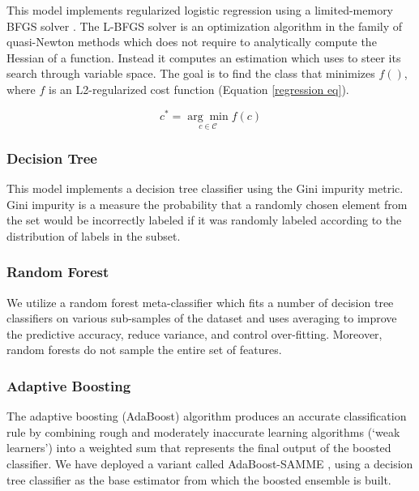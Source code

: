 \documentclass[letterpaper]{article}
\begin{document}
This model implements regularized logistic regression using a limited-memory BFGS solver \cite{liu1989limited}. The L-BFGS solver is an optimization algorithm in the family of quasi-Newton methods which does not require to analytically compute the Hessian of a function. Instead it computes an estimation which uses to steer its search through variable space. The goal is to find the class that minimizes $f()$, where $f$ is an L2-regularized cost function (Equation \ref{regression eq}).

\begin{equation} \label{regression eq}
	c^* = \underset{c \in \mathcal{C}}{\arg \min} f(c) 
\end{equation}

\subsubsection{Decision Tree} \label{Decision Tree}

This model implements a decision tree classifier using the Gini impurity metric. Gini impurity is a measure the probability that a randomly chosen element from the set would be incorrectly labeled if it was randomly labeled according to the distribution of labels in the subset.

\subsubsection{Random Forest}  \label{Random Forest}

We utilize a random forest meta-classifier which fits a number of decision tree classifiers on various sub-samples of the dataset and uses averaging to improve the predictive accuracy, reduce variance, and control over-fitting. Moreover, random forests do not sample the entire set of features.

\subsubsection{Adaptive Boosting}  \label{Adaptive Boosting}

The adaptive boosting (AdaBoost) algorithm \cite{freund1997decision} produces an accurate classification rule by combining rough and moderately inaccurate learning algorithms (`weak learners') into a weighted sum that represents the final output of the boosted classifier. We have deployed a variant called AdaBoost-SAMME \cite{hastie2009multi}, using a decision tree classifier as the base estimator from which the boosted ensemble is built.
\end{document}
